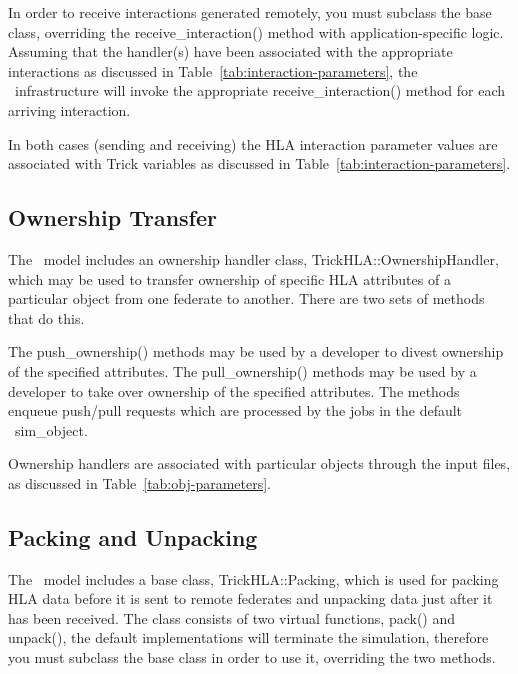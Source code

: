 In order to receive interactions generated remotely,
you must subclass the base class, overriding the
{\ttfamily receive\_interaction()} method with application-specific logic.
Assuming that the handler(s) have been associated with the appropriate
interactions as discussed in Table~\ref{tab:interaction-parameters},
the \TrickHLA\ infrastructure will invoke the appropriate
{\ttfamily receive\_interaction()} method for each arriving interaction.

In both cases (sending and receiving) the HLA interaction parameter values
are associated with Trick variables as discussed in
Table~\ref{tab:interaction-parameters}.

\subsection{Ownership Transfer}

The \TrickHLA\ model includes an ownership handler class,
{\ttfamily TrickHLA::OwnershipHandler},
which may be used to transfer ownership of specific HLA attributes
of a particular object from one federate to another.
There are two sets of methods that do this.

The {\ttfamily push\_ownership()} methods may be used by a developer to
divest ownership of the specified attributes.
The {\ttfamily pull\_ownership()} methods may be used by a developer to
take over ownership of the specified attributes.
The methods enqueue push/pull requests which are processed by the
jobs in the default \TrickHLA\  {\ttfamily sim\_object}.

Ownership handlers are associated with particular objects through the
input files, as discussed in
Table~\ref{tab:obj-parameters}.

\subsection{Packing and Unpacking}

The \TrickHLA\ model includes a base class,
{\ttfamily TrickHLA::Packing},
which is used for packing HLA data before it is sent to remote federates
and unpacking data just after it has been received.
The class consists of two virtual functions,
{\ttfamily pack()} and {\ttfamily unpack()}, the default implementations
will terminate the simulation,
therefore you must subclass the base class in order to use it,
overriding the two methods.

